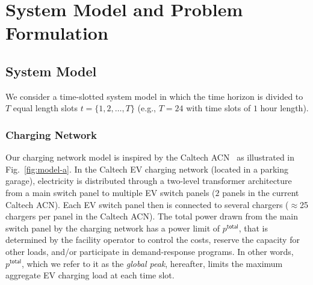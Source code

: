 \documentclass[journal]{IEEEtran}
\newcommand{\rev}[1]{{\color{black}#1}}%
\newcommand{\rev}[1]{#1}
\begin{document}

		\section{System Model and Problem Formulation}
		\label{sec:model}
		
		
		
		\subsection{System Model}
		We consider a time-slotted system model in which the time horizon is divided to $T$ equal length slots ${t=\{1, 2, \dots ,T\}}$ (e.g., $T=24$ with time slots of $1$ hour length).
\subsubsection{Charging Network}
\label{sec:acn}
Our charging network model is inspired by the Caltech ACN~\cite{lee2016adaptive} as illustrated in Fig.~\ref{fig:model-a}. In \rev{the} Caltech EV charging network (located in a parking garage), electricity is distributed through a two-level transformer architecture from a main switch panel to multiple EV switch panels (\rev{$2$} panels in the current Caltech ACN). Each EV switch panel then is connected to several chargers ($\approx$25 chargers \rev{per panel} in the Caltech ACN). The total power drawn from the main switch panel \rev{by} the charging network has a power limit of  $p^\mathsf{total}$, that is determined by the facility operator to control the costs, reserve the capacity for other loads, and/or participate in demand-response programs.  
In other words, $p^\mathsf{total}$, which we refer to it as the \textit{global peak}, hereafter, limits the maximum aggregate EV charging load at each time slot. 
\end{document}

